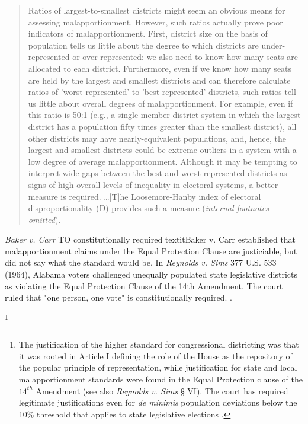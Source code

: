 \begin{quote}
  Ratios of largest-to-smallest districts might seem an obvious means for assessing malapportionment. However, such ratios actually prove poor indicators of malapportionment. First, district size on the basis of population tells us little about the degree to which districts are under-represented or over-represented: we also need to know how many seats are allocated to each district. Furthermore, even if we know how many seats are held by the largest and smallest districts and can therefore calculate ratios of 'worst represented' to 'best represented' districts, such ratios tell us little about overall degrees of malapportionment. For example, even if this ratio is 50:1 (e.g., a single-member district system in which the largest district has a population fifty times greater than the smallest district), all other districts may have nearly-equivalent populations, and, hence, the largest and smallest districts could be extreme outliers in a system with a low degree of average malapportionment. Although it may be tempting to interpret wide gaps between the best and worst represented districts as signs of high overall levels of inequality in electoral systems, a better measure is required. \dots[T]he Loosemore-Hanby index of electoral disproportionality (D) provides such a measure (\textit{internal footnotes omitted}).
 \end{quote}
 
 
        \textit{Baker v. Carr } TO constitutionally required textit{Baker v. Carr} established that malapportionment claims under the Equal Protection Clause are justiciable, but did not say what the standard would be. In \textit{Reynolds v. Sims} 377 U.S. 533 (1964), Alabama voters challenged unequally populated state legislative districts as violating  the Equal Protection Clause of the 14th Amendment. The court ruled that "one person, one vote" is constitutionally required. .  
        
            \footnote{The justification of the higher standard for congressional districting was that it was rooted in Article I defining the role of the House as the repository of the popular principle of representation, while justification for state and local malapportionment standards were found in the Equal Protection clause of the $14^{th}$ Amendment (see also \textit{Reynolds v. Sims} § VI). The court has required legitimate justifications even for \textit{de minimis} population deviations below the 10\% threshold that applies to state legislative elections \citep[][see also  \textit{Wesberry v. Sanders}, 376 U. S. 1 (1964); \textit{Kirkpatrick v. Preisler}, 394 U. S. 526 (1969); \textit{Wells v. Rockefeller}, 394 U. S. 542 (1969); \textit{White v. Weiser}, 412 U. S. 783 (1973); \textit{Gaffney v. Cummings}, 412 U. S. 735 (1973); \textit{White v.Regester} 412 U.S. 755 (1973)]{electionlaw2018}.}
            
